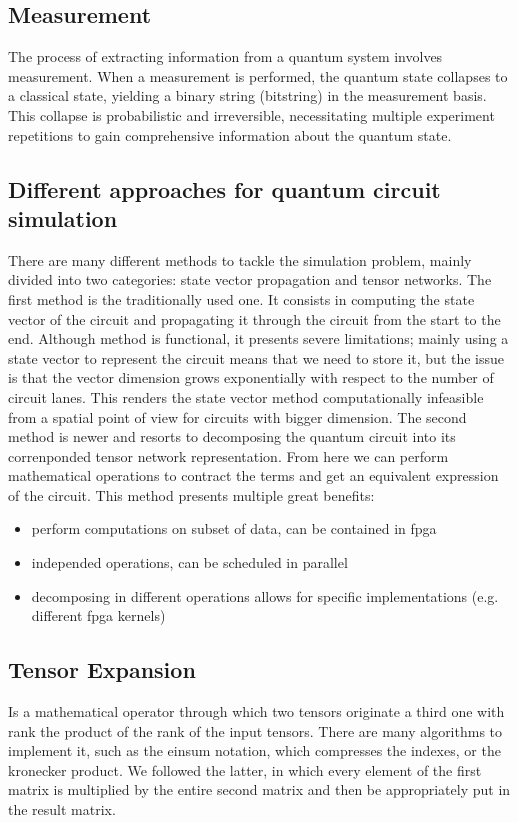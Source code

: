 \documentclass[12pt,oneside,a4paper]{article}
\begin{document}
\subsection{Measurement}
The process of extracting information from a quantum system involves measurement. When a measurement is performed, the quantum state collapses to a classical state, yielding a binary string (bitstring) in the measurement basis. This collapse is probabilistic and irreversible, necessitating multiple experiment repetitions to gain comprehensive information about the quantum state.

\subsection{Different approaches for quantum circuit simulation}
There are many different methods to tackle the simulation problem, mainly divided into two categories: state vector propagation and tensor networks.
The first method is the traditionally used one. It consists in computing the state vector of the circuit and propagating it through the circuit from the start to the end. Although method is functional, it presents severe limitations; mainly using a state vector to represent the circuit means that we need to store it, but the issue is that the vector dimension grows exponentially with respect to the number of circuit lanes. This renders the state vector method computationally infeasible from a spatial point of view for circuits with bigger dimension.
The second method is newer and resorts to decomposing the quantum circuit into its correnponded tensor network representation. From here we can perform mathematical operations to contract the terms and get an equivalent expression of the circuit.
This method presents multiple great benefits:
\begin{itemize}
    \item perform computations on subset of data, can be contained in fpga
    \item independed operations, can be scheduled in parallel
    \item decomposing in different operations allows for specific implementations (e.g. different fpga kernels)
\end{itemize}

\subsection{Tensor Expansion}
Is a mathematical operator through which two tensors originate a third one with rank the product of the rank of the input tensors. There are many algorithms to implement it, such as the einsum notation, which compresses the indexes, or the kronecker product. We followed the latter, in which every element of the first matrix is multiplied by the entire second matrix and then be appropriately put in the result matrix.
\end{document}
